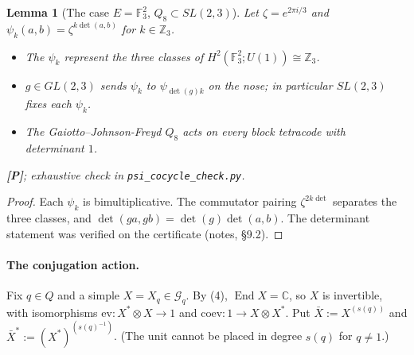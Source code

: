 \documentclass[11pt]{article}
\newtheorem{lemma}[theorem]{Lemma}
\theoremstyle{definition}
\newcommand{\cG}{\mathcal G}
\newcommand{\End}{\operatorname{End}}
\newcommand{\Z}{\mathbb Z}
\newcommand{\C}{\mathbb C}
\newcommand{\F}{\mathbb F}
\newcommand{\st}[1]{\textbf{[#1]}}
\begin{document}
\begin{lemma}[The case $E=\F_3^2$, $Q_8\subset SL(2,3)$]\label{lem:det}
Let $\zeta=e^{2\pi i/3}$ and $\psi_k(a,b)=\zeta^{k\det(a,b)}$ for $k\in\Z_3$.
\begin{itemize}[nosep]
\item The $\psi_k$ represent the three classes of $H^2(\F_3^2;U(1))\cong\Z_3$.
\item $g\in GL(2,3)$ sends $\psi_k$ to $\psi_{\det(g)k}$ on the nose; in particular $SL(2,3)$
fixes each $\psi_k$.
\item The Gaiotto--Johnson-Freyd $Q_8$ acts on every block tetracode with determinant $1$.
\end{itemize}
\st{P}; exhaustive check in \texttt{psi\_cocycle\_check.py}.
\end{lemma}
\begin{proof}
Each $\psi_k$ is bimultiplicative. The commutator pairing $\zeta^{2k\det}$ separates the three
classes, and $\det(ga,gb)=\det(g)\det(a,b)$. The determinant statement was verified on the
certificate (notes, \S9.2).
\end{proof}

\paragraph{The conjugation action.}
Fix $q\in Q$ and a simple $X=X_q\in\cG_q$. By (4), $\End X=\C$, so $X$ is invertible, with
isomorphisms $\mathrm{ev}:X^*\otimes X\to1$ and $\mathrm{coev}:1\to X\otimes X^*$. Put
$\bar X:=X^{(s(q))}$ and $\bar X^*:=(X^*)^{(s(q)^{-1})}$. (The unit cannot be placed in degree
$s(q)$ for $q\ne1$.)
\end{document}
